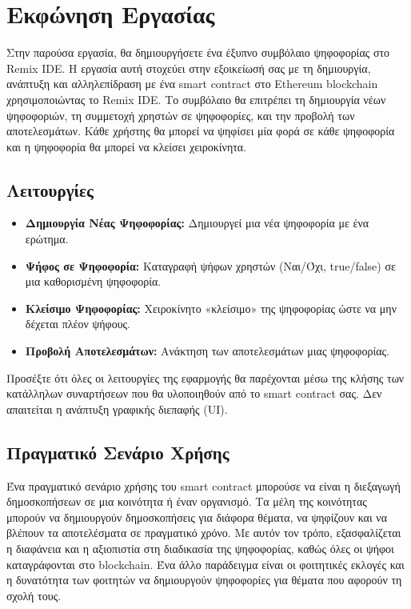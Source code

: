 \documentclass[12pt]{article}
\begin{document}
    \section{Εκφώνηση Εργασίας}

        Στην παρούσα εργασία, θα δημιουργήσετε ένα έξυπνο συμβόλαιο ψηφοφορίας στο Remix IDE. Η εργασία αυτή στοχεύει στην εξοικείωσή σας με τη δημιουργία, ανάπτυξη και αλληλεπίδραση με ένα smart contract στο Ethereum blockchain χρησιμοποιώντας το Remix IDE. Το συμβόλαιο θα επιτρέπει τη δημιουργία νέων ψηφοφοριών, τη συμμετοχή χρηστών σε ψηφοφορίες, και την προβολή των αποτελεσμάτων. Κάθε χρήστης θα μπορεί να ψηφίσει μία φορά σε κάθε ψηφοφορία και η ψηφοφορία θα μπορεί να κλείσει χειροκίνητα.

        \subsection*{Λειτουργίες}
            \begin{itemize}
                \item \textbf{Δημιουργία Νέας Ψηφοφορίας:} Δημιουργεί μια νέα ψηφοφορία με ένα ερώτημα.
                \item \textbf{Ψήφος σε Ψηφοφορία:} Καταγραφή ψήφων χρηστών (Ναι/Όχι, true/false) σε μια καθορισμένη ψηφοφορία.
                \item \textbf{Κλείσιμο Ψηφοφορίας:} Χειροκίνητο «κλείσιμο» της ψηφοφορίας ώστε να μην δέχεται πλέον ψήφους.
                \item \textbf{Προβολή Αποτελεσμάτων:} Ανάκτηση των αποτελεσμάτων μιας ψηφοφορίας.
            \end{itemize}

        Προσέξτε ότι όλες οι λειτουργίες της εφαρμογής θα παρέχονται μέσω της κλήσης των κατάλληλων συναρτήσεων που θα υλοποιηθούν από το smart contract σας. Δεν απαιτείται η ανάπτυξη γραφικής διεπαφής (UI).

        \subsection*{Πραγματικό Σενάριο Χρήσης}
        Ένα πραγματικό σενάριο χρήσης του smart contract μπορούσε να είναι η διεξαγωγή δημοσκοπήσεων σε μια κοινότητα ή έναν οργανισμό. Τα μέλη της κοινότητας μπορούν να δημιουργούν δημοσκοπήσεις για διάφορα θέματα, να ψηφίζουν και να βλέπουν τα αποτελέσματα σε πραγματικό χρόνο. Με αυτόν τον τρόπο, εξασφαλίζεται η διαφάνεια και η αξιοπιστία στη διαδικασία της ψηφοφορίας, καθώς όλες οι ψήφοι καταγράφονται στο blockchain. Ένα άλλο παράδειγμα είναι οι φοιτητικές εκλογές και η δυνατότητα των φοιτητών να δημιουργούν ψηφοφορίες για θέματα που αφορούν τη σχολή τους.
        
\end{document}
